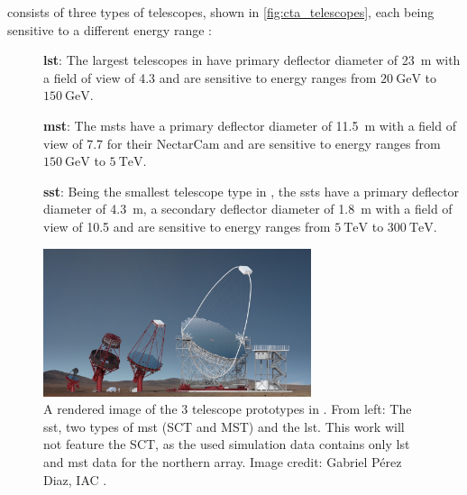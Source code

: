 \cta{} consists of three types of telescopes, shown in \autoref{fig:cta_telescopes}, each being
sensitive to a different energy range \cite{cta_specs}:
\begin{description}
    \item [] \textbf{\gls{lst}}: The largest telescopes in \cta{} have primary deflector diameter
    of \SI{23}{\meter} with a field of view of \SI{4.3}{\deg} and are sensitive to energy
    ranges from \(\SI{20}{\giga\eV}\) to \(\SI{150}{\giga\eV}\).
    \item [] \textbf{\gls{mst}}: The \glspl{mst} have a primary deflector diameter of \SI{11.5}{\meter}
    with a field of view of \SI{7.7}{\deg} for their NectarCam and are sensitive to energy ranges
    from \(\SI{150}{\giga\eV}\) to \(\SI{5}{\tera\eV}\).
    \item [] \textbf{\gls{sst}}: Being the smallest telescope type in \cta{}, the \glspl{sst}
    have a primary deflector diameter of \SI{4.3}{\meter}, a secondary deflector diameter of
    \SI{1.8}{\meter} with a field of view of \SI{10.5}{\deg} and are sensitive to energy ranges
    from \(\SI{5}{\tera\eV}\) to \(\SI{300}{\tera\eV}\).
\end{description}

\begin{figure}
    \centering
    \includegraphics[width=0.7\textwidth]{graphics/telescopes_render.jpg}
    \caption{A rendered image of the 3 telescope prototypes in \cta{}. From left: The \gls{sst},
    two types of \gls{mst} (SCT and MST) and the \gls{lst}. This work will not feature the SCT, as
    the used simulation data contains only \gls{lst} and \gls{mst} data for the northern array.
    Image credit: Gabriel Pérez Diaz, IAC \cite{cta_tech}.}
    \label{fig:cta_telescopes}
\end{figure}

